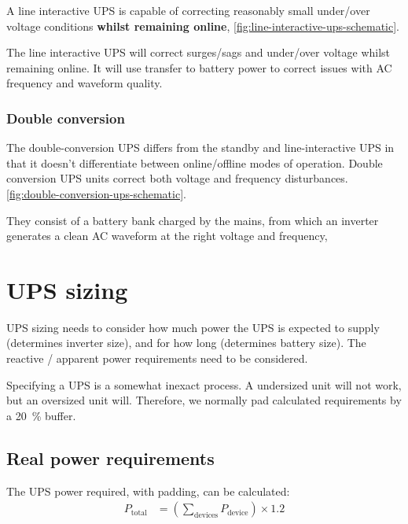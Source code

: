 \documentclass{pgnotes}
\begin{document}
A line interactive UPS is capable of correcting reasonably small under/over voltage conditions \textbf{whilst remaining online}, \autoref{fig:line-interactive-ups-schematic}.


The line interactive UPS will correct surges/sags and under/over voltage whilst remaining online.
It will use transfer to battery power to correct issues with AC frequency and waveform quality.

\subsubsection{Double conversion}

The double-conversion UPS differs from the standby and line-interactive UPS in that it doesn't differentiate between online/offline modes of operation.
Double conversion UPS units correct both voltage and frequency disturbances.
\autoref{fig:double-conversion-ups-schematic}.


They consist of a battery bank charged by the mains, from which an inverter generates a clean AC waveform at the right voltage and frequency,


\section{UPS sizing}

UPS sizing needs to consider how much power the UPS is expected to supply (determines inverter size), and for how long (determines battery size).
The reactive / apparent power requirements need to be considered. 

Specifying a UPS is a somewhat inexact process.
A undersized unit will not work, but an oversized unit will.
Therefore, we normally pad calculated requirements by a \SI{20}{\percent} buffer.

\subsection{Real power requirements}

The UPS power required, with padding, can be calculated:
\begin{align}
  P_{\mbox{total}} & = \left ( \sum_{\mbox{devices}} P_{\mbox{device}} \right ) \times 1.2
\end{align}
\end{document}
